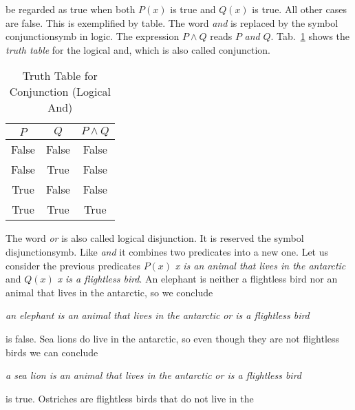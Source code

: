             be regarded as true when both $P(x)$ is true and $Q(x)$ is true.
            All other cases are false. This is exemplified by table. The word
            \textit{and} is replaced by the symbol \gls{conjunctionsymb} in
            logic. The
            expression $P\land{Q}$ reads $P$ \textit{and} $Q$.
            Tab.~\ref{tab:truth_table_conjunction} shows the
            \textit{truth table} for the logical and, which is also called
            \gls{conjunction}.
            \begin{table}[H]
                \centering
                \begin{tabular}{c | c | c}
                    $P$&$Q$&$P\land{Q}$\\
                    \hline
                    False&False&False\\
                    \hline
                    False&True&False\\
                    \hline
                    True&False&False\\
                    \hline
                    True&True&True
                \end{tabular}
                \caption{Truth Table for Conjunction (Logical And)}
                \label{tab:truth_table_conjunction}
            \end{table}
            The word \textit{or} is also called logical \gls{disjunction}.
            It is reserved the symbol \gls{disjunctionsymb}. Like
            \textit{and} it combines two predicates into a new one. Let us
            consider the previous predicates
            $P(x)$ \textit{x is an animal that lives in the antarctic} and
            $Q(x)$ \textit{x is a flightless bird}. An elephant is neither a
            flightless bird nor an animal that lives in the antarctic, so we
            conclude
            \begin{center}
                \textit{an elephant is an animal that lives in the antarctic}
                \textit{or is a flightless bird}
            \end{center}
            is false. Sea lions do live in the antarctic, so even though they
            are not flightless birds we can conclude
            \begin{center}
                \textit{a sea lion is an animal that lives in the antarctic}
                \textit{or is a flightless bird}
            \end{center}
            is true. Ostriches are flightless birds that do not live in the
